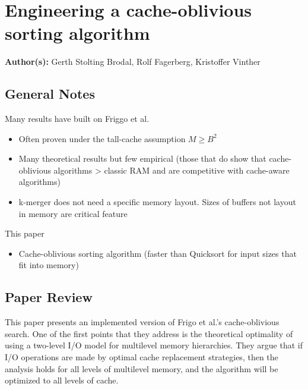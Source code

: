 \section{Engineering a cache-oblivious sorting algorithm}

\textbf{Author(s):} Gerth Stolting Brodal, Rolf Fagerberg, Kristoffer Vinther

\subsection{General Notes}

Many results have built on Friggo et al.
\begin{itemize}
    \item Often proven under the tall-cache assumption $M \geq B^2$
    \item Many theoretical results but few empirical (those that do show that cache-oblivious algorithms > classic RAM and are competitive with cache-aware algorithms)
    \item k-merger does not need a specific memory layout. Sizes of buffers not layout in memory are critical feature
\end{itemize}

This paper
\begin{itemize}
    \item Cache-oblivious sorting algorithm (faster than Quicksort for input sizes that fit into memory)
\end{itemize}

\subsection{Paper Review}

This paper presents an implemented version of Frigo et al.'s cache-oblivious search. One of the first points that they address is the theoretical optimality of using a two-level I/O model for multilevel memory hierarchies. They argue that if I/O operations are made by optimal cache replacement strategies, then the analysis holds for all levels of multilevel memory, and the algorithm will be optimized to all levels of cache.